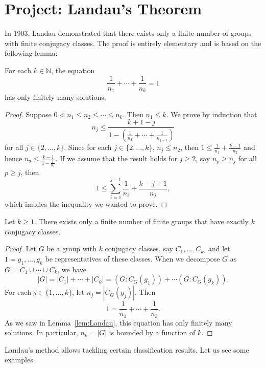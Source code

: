 \section{Project: Landau's Theorem}

In 1903, Landau demonstrated that there exists only a finite number of groups with finite conjugacy classes. The proof is entirely elementary and is based on the following lemma:

\begin{lemma}[Landau]
  \label{lem:Landau}
  For each $k \in \mathbb{N}$, the equation 
  \[
	\frac{1}{n_1}+\cdots+\frac{1}{n_k}=1
  \]
  has only finitely many solutions.
\end{lemma}

\begin{proof}
  Suppose $0 < n_1 \leq n_2 \leq \cdots \leq n_k$. Then $n_1 \leq k$.
  We prove by induction that 
  \[
    n_j \leq \frac{k+1-j}{1-\left(\frac{1}{n_1}+\cdots+\frac{1}{n_{j-1}}\right)}
  \]
  for all $j \in \{2,\dots,k\}$. Since for each $j \in \{2,\dots,k\}$, $n_j \leq n_2$, then $1 \leq \frac{1}{n_1}+\frac{k-1}{n_2}$ and hence $n_2 \leq \frac{k-1}{1-\frac{1}{n_1}}$. If we assume that the result holds for $j \geq 2$, say $n_p \geq n_j$ for all $p \geq j$, then
  \[
	1 \leq \sum_{i=1}^{j-1}\frac{1}{n_i}+\frac{k-j+1}{n_j},
  \]
  which implies the inequality we wanted to prove.
\end{proof}

\begin{theorem}[Landau]
  Let $k\geq1$. There exists only a finite number of finite groups that have exactly $k$ conjugacy classes.
\end{theorem}

\begin{proof}
  Let $G$ be a group with $k$ conjugacy classes, say $C_1,\dots,C_k$, and let $1=g_1,\dots,g_k$ be representatives of these classes. When we decompose $G$ as $G=C_1\cup\cdots\cup C_k$, we have 
  \[
    |G|=|C_1|+\cdots+|C_k|=(G:C_G(g_1))+\cdots(G:C_G(g_k)).
  \]
  For each $j \in \{1,\dots,k\}$, let $n_j=|C_G(g_j)|$. Then 
  \[
	1=\frac{1}{n_1}+\cdots+\frac{1}{n_k}.
  \]
  As we saw in Lemma~\ref{lem:Landau}, this equation has only finitely many solutions. In particular, $n_k=|G|$ is bounded by a function of $k$.
\end{proof}

Landau's method allows tackling certain classification results. Let us 
see some examples.

